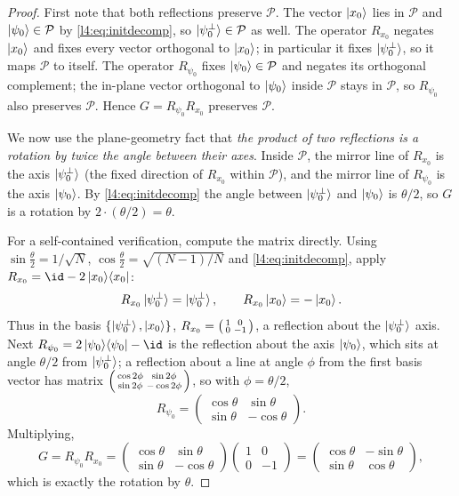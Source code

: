 \begin{proof}
First note that both reflections preserve $\mathcal{P}$. The vector $\ket{x_0}$
lies in $\mathcal{P}$ and $\ket{\psi_0}\in\mathcal{P}$ by \eqref{l4:eq:initdecomp},
so $\ket{\psi_0^{\perp}}\in\mathcal{P}$ as well. The operator $R_{x_0}$ negates
$\ket{x_0}$ and fixes every vector orthogonal to $\ket{x_0}$; in particular it
fixes $\ket{\psi_0^{\perp}}$, so it maps $\mathcal{P}$ to itself. The operator
$R_{\psi_0}$ fixes $\ket{\psi_0}\in\mathcal P$ and negates its orthogonal
complement; the in-plane vector orthogonal to $\ket{\psi_0}$ inside $\mathcal P$
stays in $\mathcal P$, so $R_{\psi_0}$ also preserves $\mathcal{P}$. Hence
$G=R_{\psi_0}R_{x_0}$ preserves $\mathcal{P}$.

We now use the plane-geometry fact that \emph{the product of two reflections is a
rotation by twice the angle between their axes}. Inside $\mathcal P$, the mirror
line of $R_{x_0}$ is the axis $\ket{\psi_0^{\perp}}$ (the fixed direction of
$R_{x_0}$ within $\mathcal P$), and the mirror line of $R_{\psi_0}$ is the axis
$\ket{\psi_0}$. By \eqref{l4:eq:initdecomp} the angle between $\ket{\psi_0^{\perp}}$
and $\ket{\psi_0}$ is $\theta/2$, so $G$ is a rotation by $2\cdot(\theta/2)=\theta$.

For a self-contained verification, compute the matrix directly. Using
$\sin\tfrac{\theta}{2}=1/\sqrt N$, $\cos\tfrac{\theta}{2}=\sqrt{(N-1)/N}$ and
\eqref{l4:eq:initdecomp}, apply $R_{x_0}=\id-2\ketbra{x_0}{x_0}$:
\[
  R_{x_0}\ket{\psi_0^{\perp}}=\ket{\psi_0^{\perp}},
  \qquad
  R_{x_0}\ket{x_0}=-\ket{x_0}.
\]
Thus in the basis $\{\ket{\psi_0^{\perp}},\ket{x_0}\}$,
$R_{x_0}=\begin{psmallmatrix}1&0\\0&-1\end{psmallmatrix}$, a reflection about the
$\ket{\psi_0^{\perp}}$ axis. Next $R_{\psi_0}=2\ketbra{\psi_0}{\psi_0}-\id$ is the
reflection about the axis $\ket{\psi_0}$, which sits at angle $\theta/2$ from
$\ket{\psi_0^{\perp}}$; a reflection about a line at angle $\phi$ from the first
basis vector has matrix
$\begin{psmallmatrix}\cos2\phi&\sin2\phi\\\sin2\phi&-\cos2\phi\end{psmallmatrix}$,
so with $\phi=\theta/2$,
\[
  R_{\psi_0}=\begin{pmatrix}\cos\theta&\sin\theta\\ \sin\theta&-\cos\theta\end{pmatrix}.
\]
Multiplying,
\[
  G=R_{\psi_0}R_{x_0}
   =\begin{pmatrix}\cos\theta&\sin\theta\\ \sin\theta&-\cos\theta\end{pmatrix}
    \begin{pmatrix}1&0\\0&-1\end{pmatrix}
   =\begin{pmatrix}\cos\theta&-\sin\theta\\ \sin\theta&\cos\theta\end{pmatrix},
\]
which is exactly the rotation by $\theta$.
\end{proof}

